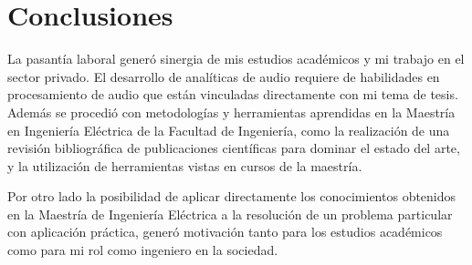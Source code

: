 \documentclass{article}
\begin{document}

\section{Conclusiones}
\label{concl}
La pasantía laboral generó sinergia de mis estudios académicos y mi trabajo en el sector privado. El desarrollo de analíticas de audio requiere de habilidades en procesamiento de audio que están vinculadas directamente con mi tema de tesis. Además se procedió con metodologías y herramientas aprendidas en la Maestría en Ingeniería Eléctrica de la Facultad de Ingeniería, como la realización de una revisión bibliográfica de publicaciones científicas para dominar el estado del arte, y la utilización de herramientas vistas en cursos de la maestría.
\smallskip

Por otro lado la posibilidad de aplicar directamente los conocimientos obtenidos en la Maestría de Ingeniería Eléctrica a la resolución de un problema particular con aplicación práctica, generó motivación tanto para los estudios académicos como para mi rol como ingeniero en la sociedad.  


\newpage



\end{document}
